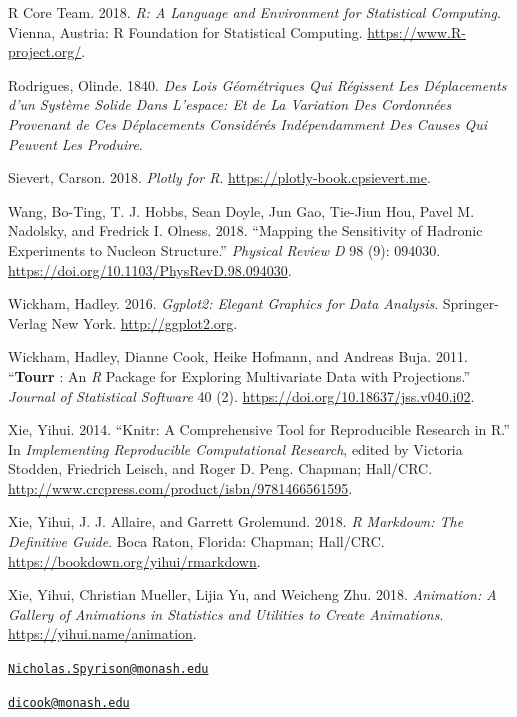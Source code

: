 \leavevmode\hypertarget{ref-r_core_team_r:_2018}{}%
R Core Team. 2018. \emph{R: A Language and Environment for Statistical
Computing}. Vienna, Austria: R Foundation for Statistical Computing.
\url{https://www.R-project.org/}.

\leavevmode\hypertarget{ref-rodrigues_lois_1840}{}%
Rodrigues, Olinde. 1840. \emph{Des Lois Géométriques Qui Régissent Les
Déplacements d'un Système Solide Dans L'espace: Et de La Variation Des
Cordonnées Provenant de Ces Déplacements Considérés Indépendamment Des
Causes Qui Peuvent Les Produire}.

\leavevmode\hypertarget{ref-sievert_plotly_2018}{}%
Sievert, Carson. 2018. \emph{Plotly for R}.
\url{https://plotly-book.cpsievert.me}.

\leavevmode\hypertarget{ref-wang_mapping_2018}{}%
Wang, Bo-Ting, T. J. Hobbs, Sean Doyle, Jun Gao, Tie-Jiun Hou, Pavel M.
Nadolsky, and Fredrick I. Olness. 2018. ``Mapping the Sensitivity of
Hadronic Experiments to Nucleon Structure.'' \emph{Physical Review D} 98
(9): 094030. \url{https://doi.org/10.1103/PhysRevD.98.094030}.

\leavevmode\hypertarget{ref-wickham_ggplot2:_2016}{}%
Wickham, Hadley. 2016. \emph{Ggplot2: Elegant Graphics for Data
Analysis}. Springer-Verlag New York. \url{http://ggplot2.org}.

\leavevmode\hypertarget{ref-wickham_tourr_2011}{}%
Wickham, Hadley, Dianne Cook, Heike Hofmann, and Andreas Buja. 2011.
``\textbf{Tourr} : An \emph{R} Package for Exploring Multivariate Data
with Projections.'' \emph{Journal of Statistical Software} 40 (2).
\url{https://doi.org/10.18637/jss.v040.i02}.

\leavevmode\hypertarget{ref-stodden_knitr:_2014}{}%
Xie, Yihui. 2014. ``Knitr: A Comprehensive Tool for Reproducible
Research in R.'' In \emph{Implementing Reproducible Computational
Research}, edited by Victoria Stodden, Friedrich Leisch, and Roger D.
Peng. Chapman; Hall/CRC.
\url{http://www.crcpress.com/product/isbn/9781466561595}.

\leavevmode\hypertarget{ref-xie_r_2018}{}%
Xie, Yihui, J. J. Allaire, and Garrett Grolemund. 2018. \emph{R
Markdown: The Definitive Guide}. Boca Raton, Florida: Chapman; Hall/CRC.
\url{https://bookdown.org/yihui/rmarkdown}.

\leavevmode\hypertarget{ref-xie_animation:_2018}{}%
Xie, Yihui, Christian Mueller, Lijia Yu, and Weicheng Zhu. 2018.
\emph{Animation: A Gallery of Animations in Statistics and Utilities to
Create Animations}. \url{https://yihui.name/animation}.



\address{%
Nicholas Spyrison\\
Monash University\\
Faculty of Information Technology\\
}
\href{mailto:Nicholas.Spyrison@monash.edu}{\nolinkurl{Nicholas.Spyrison@monash.edu}}

\address{%
Dianne Cook\\
Monash University\\
Department of Econometrics and Business Statistics\\
}
\href{mailto:dicook@monash.edu}{\nolinkurl{dicook@monash.edu}}

